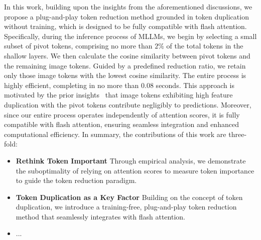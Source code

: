 In this work, building upon the insights from the aforementioned discussions, we propose a plug-and-play token reduction method grounded in token duplication without training, which is designed to be fully compatible with flash attention. 
Specifically, during the inference process of MLLMs, we begin by selecting a small subset of pivot tokens, comprising no more than $2\%$ of the total tokens in the shallow layers. 
We then calculate the cosine similarity between pivot tokens and the remaining image tokens. Guided by a predefined reduction ratio, we retain only those image tokens with the lowest cosine similarity. The entire process is highly efficient, completing in no more than $0.08$ seconds. This approach is motivated by the prior insights~\citep{gong2021vision} that image tokens exhibiting high feature duplication with the pivot tokens contribute negligibly to predictions. Moreover, since our entire process operates independently of attention scores, it is fully compatible with flash attention, ensuring seamless integration and enhanced computational efficiency.
In summary, the contributions of this work are three-fold:
\begin{itemize}
    \item \textbf{Rethink Token Important} Through empirical analysis, we demonstrate the suboptimality of relying on attention scores to measure token importance to guide the token reduction paradigm.
    \item \textbf{Token Duplication as a Key Factor} Building on the concept of token duplication, we introduce a training-free, plug-and-play token reduction method that seamlessly integrates with flash attention. 
    \item ...
\end{itemize}

